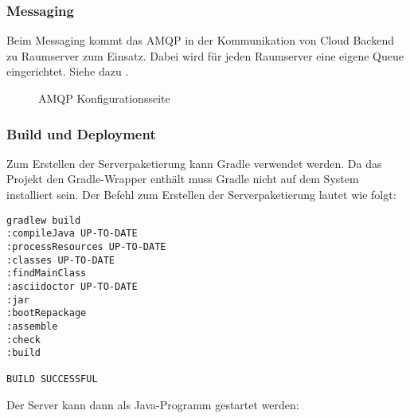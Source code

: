 \subsubsection{Messaging}\label{Messaging}

Beim Messaging kommt das \ac{AMQP} in der Kommunikation von Cloud Backend zu Raumserver zum Einsatz. Dabei wird für jeden Raumserver eine eigene Queue eingerichtet. Siehe dazu .


\begin{figure}[H]
\centering
{}
\caption{AMQP Konfigurationsseite}
\label{fig:AMQP}
\end{figure}

\subsubsection{Build und Deployment}\label{Backend_Deployment}
Zum Erstellen der Serverpaketierung kann Gradle verwendet werden. Da das Projekt den Gradle-Wrapper enthält muss Gradle nicht auf dem System installiert sein. Der Befehl zum Erstellen der Serverpaketierung lautet wie folgt:\\
\vspace{2em}
\begin{lstlisting}
gradlew build
:compileJava UP-TO-DATE
:processResources UP-TO-DATE
:classes UP-TO-DATE
:findMainClass
:asciidoctor UP-TO-DATE
:jar
:bootRepackage
:assemble
:check
:build

BUILD SUCCESSFUL

\end{lstlisting}
\vspace{2em}
Der Server kann dann als Java-Programm gestartet werden:\\
